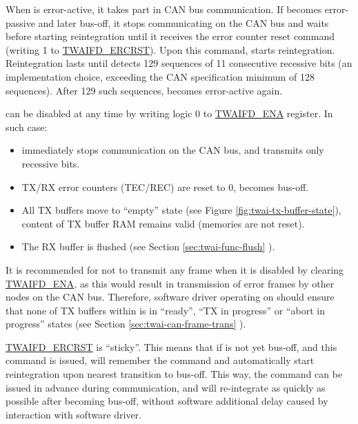 \documentclass[main\_\_EN.tex]{subfiles}
\begin{document}
When \modulename{} is error-active, it takes part in CAN bus communication. If \modulename{} becomes error-passive and later bus-off, it stops communicating on the CAN bus and waits before starting reintegration until it receives the error counter reset command (writing 1 to \hyperref[fielddesc:TWAIFDERCRST]{TWAIFD\_ERCRST}). Upon this command, \modulename{} starts reintegration. Reintegration lasts until \modulename{} detects 129 sequences of 11 consecutive recessive bits (an implementation choice, exceeding the CAN specification minimum of 128 sequences). After 129 such sequences, \modulename{} becomes error-active again.

\modulename{} can be disabled at any time by writing logic 0 to \hyperref[fielddesc:TWAIFDENA]{TWAIFD\_ENA} register. In such case:

\begin{itemize}
    \item \modulename{} immediately stops communication on the CAN bus, and transmits only recessive bits.
    \item TX/RX error counters (TEC/REC) are reset to 0, \modulename{} becomes bus-off.
    \item All TX buffers move to ``empty'' state (see Figure \ref{fig:twai-tx-buffer-state}), content of TX buffer RAM remains valid (memories are not reset).
    \item The RX buffer is flushed (see Section \ref{sec:twai-func-flush} \textit{}).
\end{itemize}

It is recommended for \modulename{} not to transmit any frame when it is disabled by clearing \hyperref[fielddesc:TWAIFDENA]{TWAIFD\_ENA}, as this would result in transmission of error frames by other nodes on the CAN bus. Therefore, software driver operating on \modulename{} should ensure that none of TX buffers within \modulename{} is in ``ready'', ``TX in progress'' or ``abort in progress'' states (see Section \ref{sec:twai-can-frame-trans} \textit{}).

\hyperref[fielddesc:TWAIFDERCRST]{TWAIFD\_ERCRST} is ``sticky''. This means that if \modulename{} is not yet bus-off, and this command is issued, \modulename{} will remember the command and automatically start reintegration upon nearest transition to bus-off. This way, the command can be issued in advance during communication, and \modulename{} will re-integrate as quickly as possible after becoming bus-off, without software additional delay caused by interaction with software driver.
\end{document}
